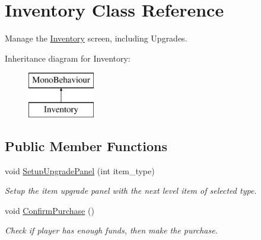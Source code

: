 \hypertarget{class_inventory}{}\section{Inventory Class Reference}
\label{class_inventory}


Manage the \mbox{\hyperlink{class_inventory}{Inventory}} screen, including Upgrades.  


Inheritance diagram for Inventory\+:\begin{figure}[H]
\begin{center}
\leavevmode
\includegraphics[height=2.000000cm]{class_inventory}
\end{center}
\end{figure}
\subsection*{Public Member Functions}
\begin{DoxyCompactItemize}
\item 
void \mbox{\hyperlink{class_inventory_aa99e2b5246a749ec59f04aa1ce48416a}{Setup\+Upgrade\+Panel}} (int item\+\_\+type)
\begin{DoxyCompactList}\small\item\em Setup the item upgrade panel with the next level item of selected type. \end{DoxyCompactList}\item 
void \mbox{\hyperlink{class_inventory_a284995426324c648b4c9144a3b9bc277}{Confirm\+Purchase}} ()
\begin{DoxyCompactList}\small\item\em Check if player has enough funds, then make the purchase. \end{DoxyCompactList}\end{DoxyCompactItemize}
